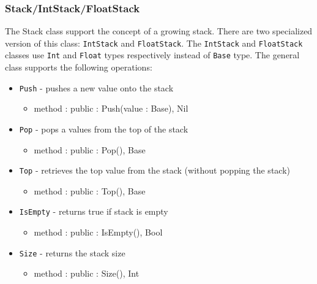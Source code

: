 \documentclass[12pt]{article}
\begin{document}
\subsubsection{Stack/IntStack/FloatStack}
The Stack class support the concept of a growing stack.  There are two specialized version of this class: \texttt{IntStack} and \texttt{FloatStack}.  The \texttt{IntStack} and \texttt{FloatStack} classes use \texttt{Int} and \texttt{Float} types respectively instead of \texttt{Base} type.  The general class supports the following operations:
\begin{itemize}
\item \texttt{Push} - pushes a new value onto the stack
  \begin{itemize}
  \item method : public : Push(value : Base), Nil
  \end{itemize}
\item \texttt{Pop} - pops a values from the top of the stack
  \begin{itemize}
  \item method : public : Pop(), Base
  \end{itemize}
\item \texttt{Top} - retrieves the top value from the stack (without popping the stack)
  \begin{itemize}
  \item method : public : Top(), Base
  \end{itemize}
\item \texttt{IsEmpty} - returns true if stack is empty
  \begin{itemize}
  \item method : public : IsEmpty(), Bool
  \end{itemize}
\item \texttt{Size} - returns the stack size
  \begin{itemize}
  \item method : public : Size(), Int
  \end{itemize}
\end{itemize}
\end{document}
